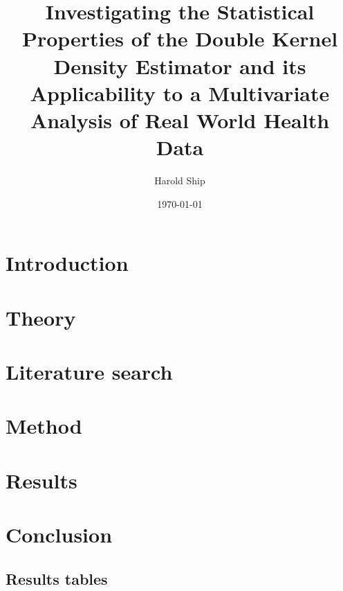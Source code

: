 \documentclass[a4paper,12pt,titlepage,twoside,openany]{book}
\title{Investigating the Statistical Properties of the Double Kernel Density Estimator and its Applicability to a Multivariate Analysis of Real World Health Data}
\author{Harold Ship}
\date{\today}
\begin{document}
\frontmatter                            %
\maketitle                              %
\tableofcontents                        %

\clearpage
\listoftables
\clearpage
\listoffigures
\clearpage
\printnomenclature
\clearpage

\mainmatter                             %

\chapter{Introduction}

\chapter{Theory}

\chapter{Literature search}

\chapter{Method}

\chapter{Results}


\chapter{Conclusion}

\begin{appendices}
\chapter{Results tables}

\end{appendices}
\end{document}
